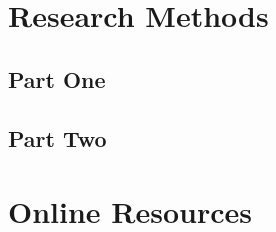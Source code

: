 \documentclass[acmtog]{acmart}
\begin{document}
\appendix

\section{Research Methods}

\subsection{Part One}



\subsection{Part Two}



\section{Online Resources}
\end{document}
